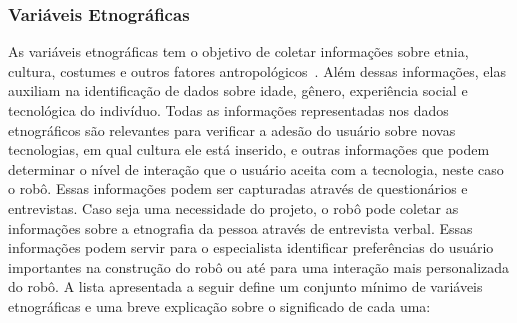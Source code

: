 \subsubsection{Variáveis Etnográficas}
\label{sec:etnograficas}
As variáveis etnográficas tem o objetivo de coletar informações sobre etnia, cultura, costumes e outros fatores antropológicos~\cite{borges:2005}. Além dessas informações, elas auxiliam na identificação de dados sobre idade, gênero, experiência social e tecnológica do indivíduo. Todas as informações representadas nos dados etnográficos são relevantes para verificar a adesão do usuário sobre novas tecnologias, em qual cultura ele está inserido, e outras informações que podem determinar o nível de interação que o usuário aceita com a tecnologia, neste caso o robô. Essas informações podem ser capturadas através de questionários e entrevistas. Caso seja uma necessidade do projeto, o robô pode coletar as informações sobre a etnografia da pessoa através de entrevista verbal. Essas informações podem servir para o especialista identificar preferências do usuário importantes na construção do robô ou até para uma interação mais personalizada do robô. A lista apresentada a seguir define um conjunto mínimo de variáveis etnográficas e uma breve explicação sobre o significado de cada uma:

